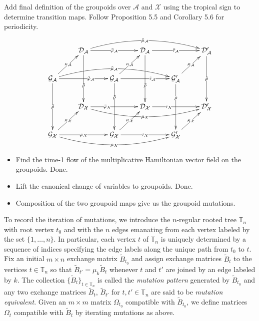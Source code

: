 \documentclass{amsart}
\numberwithin{equation}{section}
\newcommand{\cA}{\mathcal{A}}
\newcommand{\cG}{\mathcal{G}}
\renewcommand{\cD}{\mathcal{D}}
\newcommand{\cX}{\mathcal{X}}
\newcommand{\TT}{\mathbb{T}}
\begin{document}
Add final definition of the groupoids over $\cA$ and $\cX$ using the tropical sign to determine transition maps.
Follow \cite{gekhtman-nakanishi-rupel} Proposition 5.5 and Corollary 5.6 for periodicity.

\newpage

\begin{equation} \label{eq:GpdCD}
	\xymatrix{
		& \cD_\cA \ar[dd]|-(.65){\bar{\rho}} \ar[rr]|-{\bar{\varphi}_\cA} \ar@/^1.2pc/[rrrr]|-{\bar{\mu}_\cA} && \cD_\cA \ar[dd]|-(.65){\bar{\rho}} \ar[rr]|-{\bar{\tau}_\cA} && \cD'_\cA \ar[dd]|-{\bar{\rho}} \\
	\cG_\cA \ar[dd]|-{\tilde{\rho}} \ar[rr]|-(.65){\tilde{\varphi}_\cA} \ar[ur]|-{\kappa_\cA} \ar@/^1.2pc/[rrrr]|-{\tilde{\mu}_\cA} && \cG_\cA \ar[dd]|-(.3){\tilde{\rho}} \ar[rr]|-(.65){\tilde{\tau}_\cA} \ar[ur]|-{\kappa_\cA} && \cG'_\cA \ar[dd]|-(.3){\tilde{\rho}} \ar[ur]|-{\kappa_\cA} \\
		& \cD_\cX \ar[rr]|-(.35){\bar{\varphi}_\cX} \ar@/_1.2pc/[rrrr]|-{\bar{\mu}_\cX} && \cD_\cX \ar[rr]|-(.35){\bar{\tau}_\cX} && \cD'_\cX \\
	\cG_\cX \ar[rr]|-{\tilde{\varphi}_\cX} \ar[ur]|-{\kappa_\cX} \ar@/_1.2pc/[rrrr]|-{\tilde{\mu}_\cX} && \cG_\cX \ar[rr]|-{\tilde{\tau}_\cX} \ar[ur]|-{\kappa_\cX} && \cG'_\cX \ar[ur]|-{\kappa_\cX}
	}
\end{equation}

\begin{itemize}
\item Find the time-1 flow of the multiplicative Hamiltonian vector field on the groupoids.  Done.
\item Lift the canonical change of variables to groupoids.  Done.
\item Composition of the two groupoid maps give us the groupoid mutations.
\end{itemize}

\newpage 

To record the iteration of mutations, we introduce the $n$-regular rooted tree $\TT_n$ with root vertex $t_0$ and with the $n$ edges emanating from each vertex labeled by the set $\{1,\ldots,n\}$.
In particular, each vertex $t$ of $\TT_n$ is uniquely determined by a sequence of indices specifying the edge labels along the unique path from $t_0$ to $t$.
Fix an initial $m\times n$ exchange matrix $\tilde B_{t_0}$ and assign exchange matrices $\tilde B_t$ to the vertices $t\in\TT_n$ so that $\tilde B_{t'}=\mu_k\tilde B_t$ whenever $t$ and $t'$ are joined by an edge labeled by $k$.
The collection $\{\tilde B_t\}_{t\in\TT_n}$ is called the \emph{mutation pattern} generated by $\tilde B_{t_0}$ and any two exchange matrices $\tilde B_t$, $\tilde B_{t'}$ for $t,t'\in\TT_n$ are said to be \emph{mutation equivalent}.
Given an $m\times m$ matrix $\Omega_{t_0}$ compatible with $\tilde B_{t_0}$, we define matrices $\Omega_t$ compatible with $\tilde B_t$ by iterating mutations as above.
\end{document}
